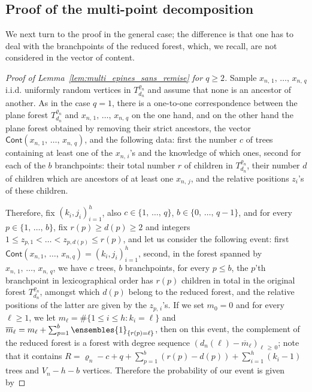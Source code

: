 \documentclass[AHL,Unicode,longabstracts,published]{cedram}
\newcommand{\1}{\ensembles{1}}
\newcommand{\ind}[1]{\1_{\{#1\}}}
\renewcommand{\le}{\leqslant}
\renewcommand{\ge}{\geqslant}
\newcommand{\Cont}{\mathsf{Cont}}
\newcommand{\fn}{T_{d_n}^{\varrho_n}}
\newcommand{\vertices}{V}
\begin{document}
\subsection{Proof of the multi-point decomposition}


We next turn to the proof in the general case; the difference is that one has to deal with the branchpoints of the reduced forest, which, we recall, are not considered in the vector of content.

\begin{proof}[Proof of Lemma~\ref{lem:multi_epines_sans_remise} for $q \ge 2$]
Sample $x_{n,\,1},\,\dots,\,x_{n,\,q}$ i.i.d. uniformly random vertices in $\fn$ and assume that none is an ancestor of another. As in the case $q=1$, there is a one-to-one correspondence between the plane forest $\fn$ and $x_{n,\,1},\,\dots,\,x_{n,\,q}$ on the one hand, and on the other hand the plane forest obtained by removing their strict ancestors, the vector $\Cont(x_{n,\,1},\, \dots,\,x_{n,\,q})$, and the following data: first the number $c$ of trees containing at least one of the $x_{n,\,i}$'s and the knowledge of which ones, second for each of the $b$ branchpoints: their total number $r$ of children in $\fn$, their number $d$ of children which are ancestors of at least one $x_{n,\,j}$, and the relative positions $z_i$'s of these children.


Therefore, fix $(k_i, j_i)_{i=1}^h$, also $c \in \{1, \,\dots,\,q\}$, $b \in \{0,\,\dots,\,q-1\}$, and for every $p \in \{1,\,\dots,\,b\}$, fix $r(p) \ge d(p) \ge 2$ and integers $1 \le z_{p,1} < \dots < z_{p, d(p)} \le r(p)$, and let us consider the following event: first $\Cont(x_{n,1},\,\dots,\,x_{n,q}) = (k_i, j_i)_{i=1}^h$, second, in the forest spanned by $x_{n,\,1},\,\dots, \,x_{n,\,q}$, we have $c$ trees, $b$ branchpoints, for every $p \le b$, the $p$'th branchpoint in lexicographical order has $r(p)$ children in total in the original forest $\fn$, amongst which $d(p)$ belong to the reduced forest, and the relative positions of the latter are given by the $z_{p,\,i}$'s. If we set $m_0 = 0$ and for every $\ell \ge 1$, we let $m_\ell = \#\{1 \le i \le h : k_i = \ell\}$ and $\overline{m}_\ell = m_\ell + \sum_{p=1}^b \ind{r(p) = \ell}$, then on this event, the complement of the reduced forest is a forest with degree sequence $(d_n(\ell)-\overline{m}_\ell)_{\ell\,\ge\,0}$; note that it contains $R = \varrho_n - c + q + \sum_{p=1}^b (r(p) - d(p)) + \sum_{i=1}^h (k_i - 1)$ trees and $\vertices_n - h - b$ vertices. Therefore the probability of our event is given by


\end{proof}
\end{document}
